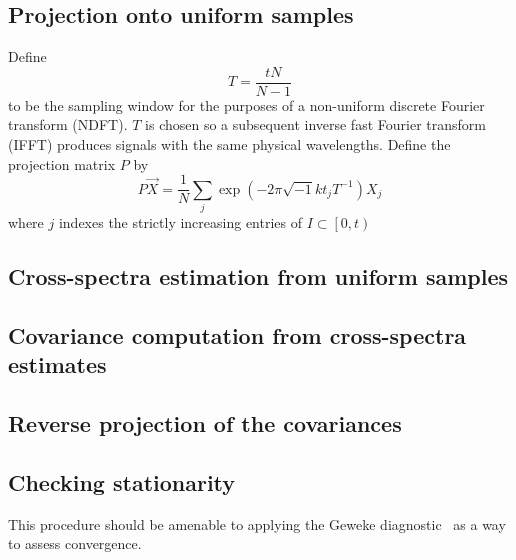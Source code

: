 \documentclass[letterpaper,11pt,nointlimits,reqno]{amsart}
\begin{document}
\subsection*{Projection onto uniform samples}

Define
$$
T = \frac{t N}{N-1}
$$
to be the sampling window for the purposes of a non-uniform discrete Fourier
transform (NDFT).  $T$ is chosen so a subsequent inverse fast Fourier transform
(IFFT) produces signals with the same physical wavelengths.  Define the
projection matrix $P$ by
$$
    P \vec{X}
    = 
    \frac{1}{N}
    \sum_j \exp\left(-2\pi \sqrt{-1} k t_j T^{-1} \right) X_j
$$
where $j$ indexes the strictly increasing entries of $I\subset\left[0,t\right)$

\subsection*{Cross-spectra estimation from uniform samples}

\subsection*{Covariance computation from cross-spectra estimates}

\subsection*{Reverse projection of the covariances}

\subsection*{Checking stationarity}

This procedure should be amenable to applying the Geweke
diagnostic~\cite{Geweke1992Evaluating} as a way to assess convergence.




\end{document}
